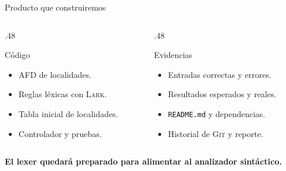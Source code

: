 \documentclass[11pt,spanish]{beamer}
\newcommand{\term}[1]{\textbf{\textcolor{indiagreen!80!black}{#1}}}
\begin{document}
\begin{frame}{Producto que construiremos}
\vfill

\begin{columns}[T,onlytextwidth]
\begin{column}{.48\textwidth}
\begin{block}{Código}
\begin{itemize}
  \item AFD de localidades.
  \item Reglas léxicas con \textsc{Lark}.
  \item Tabla inicial de localidades.
  \item Controlador y pruebas.
\end{itemize}
\end{block}
\end{column}
\begin{column}{.48\textwidth}
\begin{block}{Evidencias}
\begin{itemize}
  \item Entradas correctas y errores.
  \item Resultados esperados y reales.
  \item \texttt{README.md} y dependencias.
  \item Historial de \textsc{Git} y reporte.
\end{itemize}
\end{block}
\end{column}
\end{columns}

\bigskip

\begin{center}
\term{El lexer quedará preparado para alimentar al analizador sintáctico.}
\end{center}

\vfill
\end{frame}
\end{document}
